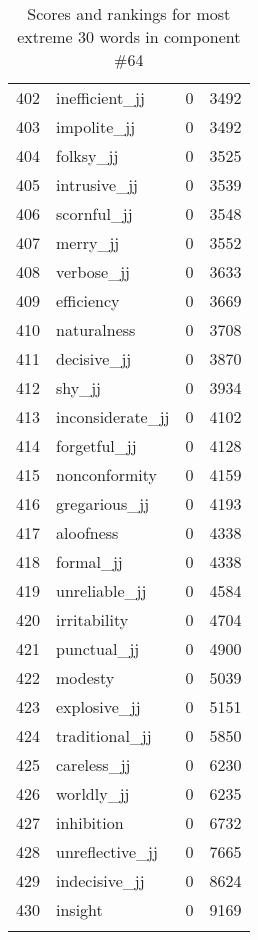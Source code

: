 \begin{longtable}[!htbp]{| rlr@{.}l |}
    402 & inefficient\_jj & 0 & 3492 \\
    403 & impolite\_jj & 0 & 3492 \\
    404 & folksy\_jj & 0 & 3525 \\
    405 & intrusive\_jj & 0 & 3539 \\
    406 & scornful\_jj & 0 & 3548 \\
    407 & merry\_jj & 0 & 3552 \\
    408 & verbose\_jj & 0 & 3633 \\
    409 & efficiency & 0 & 3669 \\
    410 & naturalness & 0 & 3708 \\
    411 & decisive\_jj & 0 & 3870 \\
    412 & shy\_jj & 0 & 3934 \\
    413 & inconsiderate\_jj & 0 & 4102 \\
    414 & forgetful\_jj & 0 & 4128 \\
    415 & nonconformity & 0 & 4159 \\
    416 & gregarious\_jj & 0 & 4193 \\
    417 & aloofness & 0 & 4338 \\
    418 & formal\_jj & 0 & 4338 \\
    419 & unreliable\_jj & 0 & 4584 \\
    420 & irritability & 0 & 4704 \\
    421 & punctual\_jj & 0 & 4900 \\
    422 & modesty & 0 & 5039 \\
    423 & explosive\_jj & 0 & 5151 \\
    424 & traditional\_jj & 0 & 5850 \\
    425 & careless\_jj & 0 & 6230 \\
    426 & worldly\_jj & 0 & 6235 \\
    427 & inhibition & 0 & 6732 \\
    428 & unreflective\_jj & 0 & 7665 \\
    429 & indecisive\_jj & 0 & 8624 \\
    430 & insight & 0 & 9169 \\
    \hline
    \caption{Scores and rankings for most extreme 30 words in component \#64} \\
\end{longtable}
